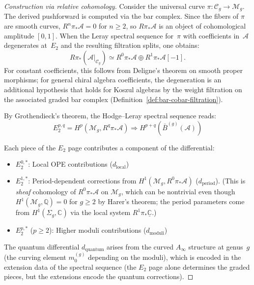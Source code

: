 \begin{proof}[Construction via relative cohomology]
Consider the universal curve $\pi: \mathcal{C}_g \to \mathcal{M}_g$. The derived pushforward is computed via the bar complex.
Since the fibers of $\pi$ are smooth curves, $R^n\pi_*\mathcal{A} = 0$ for $n \geq 2$, so $R\pi_*\mathcal{A}$ is an object of cohomological amplitude $[0,1]$. When the Leray spectral sequence for~$\pi$ with coefficients in~$\mathcal{A}$ degenerates at~$E_2$ and the resulting filtration splits, one obtains:
\[R\pi_* \left(\mathcal{A}|_{\mathcal{C}_g}\right) \simeq R^0\pi_* \mathcal{A} \oplus R^1\pi_* \mathcal{A}[-1].\] For constant coefficients, this follows from Deligne's theorem on smooth proper morphisms; for general chiral algebra coefficients, the degeneration is an additional hypothesis that holds for Koszul algebras by the weight filtration on the associated graded bar complex (Definition~\ref{def:bar-cobar-filtration}).

By Grothendieck's theorem, the Hodge--Leray spectral sequence reads:
\[E_2^{p,q} = H^p(\mathcal{M}_g, R^q\pi_*\mathcal{A}) \Rightarrow H^{p+q}(\bar{B}^{(g)}(\mathcal{A}))\]

Each piece of the $E_2$ page contributes a component of the differential:
\begin{itemize}
\item $E_2^{0,*}$: Local OPE contributions ($d_{\text{local}}$)
\item $E_2^{1,*}$: Period-dependent corrections from $H^1(\mathcal{M}_g, R^0\pi_*\mathcal{A})$ ($d_{\text{period}}$). (This is \emph{sheaf} cohomology of $R^0\pi_*\mathcal{A}$ on $\mathcal{M}_g$, which can be nontrivial even though $H^1(\mathcal{M}_g, \mathbb{Q}) = 0$ for $g \geq 2$ by Harer's theorem; the period parameters come from $H^1(\Sigma_g, \mathbb{C})$ via the local system $R^1\pi_*\underline{\mathbb{C}}$.)
\item $E_2^{p,*}$ ($p \geq 2$): Higher moduli contributions ($d_{\text{moduli}}$)
\end{itemize}
The quantum differential $d_{\text{quantum}}$ arises from the curved $A_\infty$ structure at genus~$g$ (the curving element $m_0^{(g)}$ depending on the moduli), which is encoded in the extension data of the spectral sequence (the $E_2$ page alone determines the graded pieces, but the extensions encode the quantum corrections).


\end{proof}
